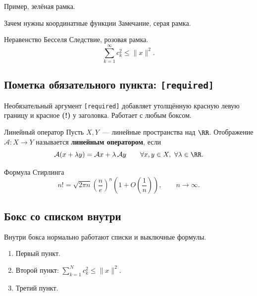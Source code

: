 \begin{Example}{}{}
	Пример, зелёная рамка.
\end{Example}

\begin{Remark}{Зачем нужны координатные функции}{}
	Замечание, серая рамка.
\end{Remark}

\begin{Corollary}{Неравенство Бесселя}{}
	Следствие, розовая рамка.
	\[
	\sum_{k=1}^{\infty} c_k^2 \le \|x\|^2.
	\]
\end{Corollary}

\subsection{Пометка обязательного пункта: \texttt{[required]}}

Необязательный аргумент \verb|[required]| добавляет утолщённую красную
левую границу и красное \textbf{(!)} у заголовка. Работает с любым боксом.

\begin{Definition}[required]{Линейный оператор}{}
	Пусть $X, Y$~--- линейные пространства над $\RR$. Отображение
	$\mathcal{A}\colon X \to Y$ называется \textbf{линейным оператором}, если
	\[
	\mathcal{A}(x + \lambda y) = \mathcal{A}x + \lambda\,\mathcal{A}y
	\qquad \forall x, y \in X,\ \forall \lambda \in \RR.
	\]
\end{Definition}

\begin{Theorem}[required]{Формула Стирлинга}{}
	\[
	n!=\sqrt{2\pi n}\left(\frac{n}{e}\right)^n\left(1+O\!\left(\frac1n\right)\right),
	\qquad n\to\infty.
	\]
\end{Theorem}

\subsection{Бокс со списком внутри}

\begin{Remark}{}{}
	Внутри бокса нормально работают списки и выключные формулы.
	\begin{enumerate}
		\item Первый пункт.
		\item Второй пункт: $\displaystyle \sum_{k=1}^{N} c_k^2 \le \|x\|^2$.
		\item Третий пункт.
	\end{enumerate}
\end{Remark}

